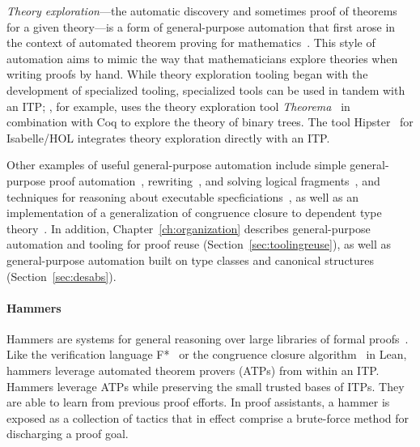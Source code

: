 \textit{Theory exploration}---the automatic discovery and sometimes proof of theorems for a given theory---is a form of 
general-purpose automation that first arose in the context of automated theorem proving for 
mathematics~\citep{buchberger2000theory}. This style of automation aims to mimic the way that
mathematicians explore theories when writing proofs by hand.
While theory exploration tooling began with the development of specialized tooling,
specialized tools can be used in tandem with an ITP;
\cite{dramnesc2015theory}, for example, uses the theory exploration tool \textit{Theorema}~\citep{buchberger2006theorema}
in combination with Coq to explore the theory of binary trees.
The tool Hipster~\citep{JohanssonRSC14, DBLP:journals/eceasst/ValbuenaJ15, Johansson2017} for Isabelle/HOL integrates
theory exploration directly with an ITP.

Other examples of useful general-purpose automation include simple general-purpose proof automation~\citep{coq-tactics, auto2, Lindblad2004},
rewriting~\citep{coq-tactics, nipkow1989term}, %
and solving logical fragments~\citep{paulson1999generic, lescuyer2009improving, hurd2003first, kumar1991integrating, busch1994first, dahn1997integration, hurd1999integrating}, and techniques for reasoning about executable specficiations~\citep{barthe2002efficient},
as well as an implementation of a generalization of congruence closure to dependent type theory~\citep{DBLP:journals/corr/SelsamM17}.
In addition, Chapter~\ref{ch:organization} describes general-purpose automation and tooling for proof reuse (Section~\ref{sec:toolingreuse}),
as well as general-purpose automation built on type classes and canonical structures (Section~\ref{sec:desabs}).


\paragraph{Hammers}
Hammers are systems for general reasoning over large libraries of formal proofs~\citep{Blanchette2016}.
Like the verification language F*~\citep{Swamy2016} or the congruence closure algorithm~\citep{DBLP:journals/corr/SelsamM17} in Lean,
hammers leverage automated theorem provers (ATPs) from within an ITP. Hammers leverage ATPs while preserving the small trusted bases of ITPs.
They are able to learn from previous proof efforts.
In proof assistants, a hammer is exposed as a collection of tactics that in effect comprise a brute-force method for discharging a proof goal.

